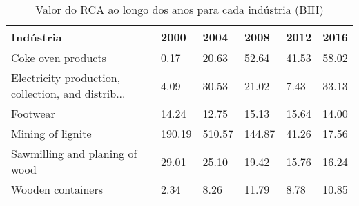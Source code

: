 \begin{table}
\centering
\caption{Valor do RCA ao longo dos anos para cada indústria (BIH)}
\label{tab:ex3-tempo-BIH}
\begin{tabular}{p{6cm}p{1.5cm}p{1.5cm}p{1.5cm}p{1.5cm}p{1.5cm}}
\toprule
                                         Indústria &   2000 &   2004 &   2008 &  2012 &  2016 \\
\midrule
                                Coke oven products &   0.17 &  20.63 &  52.64 & 41.53 & 58.02 \\
Electricity production, collection, and distrib... &   4.09 &  30.53 &  21.02 &  7.43 & 33.13 \\
                                          Footwear &  14.24 &  12.75 &  15.13 & 15.64 & 14.00 \\
                                 Mining of lignite & 190.19 & 510.57 & 144.87 & 41.26 & 17.56 \\
                    Sawmilling and planing of wood &  29.01 &  25.10 &  19.42 & 15.76 & 16.24 \\
                                 Wooden containers &   2.34 &   8.26 &  11.79 &  8.78 & 10.85 \\
\bottomrule
\end{tabular}
\end{table}

